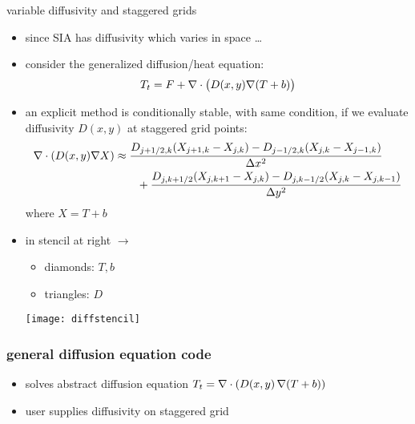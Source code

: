 \begin{frame}{variable diffusivity and staggered grids}

\begin{itemize}
  \item since SIA has diffusivity which varies in space \dots
  \item consider the generalized diffusion/heat equation:
     $$T_t = F + \nabla\cdot \big(D(x,y) \nabla (T+b)\big)$$
  \item an explicit method is conditionally stable, with same condition, if we evaluate diffusivity $D(x,y)$ at \alert{staggered} grid points:
  \small
\begin{align*}
\nabla\cdot \left(D(x,y) \nabla X\right) &\approx \frac{D_{j+1/2,k}(X_{j+1,k} - X_{j,k}) - D_{j-1/2,k}(X_{j,k} - X_{j-1,k})}{\Delta x^2} \\
	&\qquad + \frac{D_{j,k+1/2}(X_{j,k+1} - X_{j,k}) - D_{j,k-1/2}(X_{j,k} - X_{j,k-1})}{\Delta y^2}
\end{align*}
\normalsize
where $X=T+b$
\item in stencil at right $\longrightarrow$
    \begin{itemize}
    \item[] diamonds: $T,b$
    \item[] triangles: $D$
    \end{itemize}

\vspace{-15mm}
\hfill \texttt{[image: diffstencil]}
\end{itemize}
\end{frame}


\begin{frame}
  \frametitle{general diffusion equation code}


\small
\begin{itemize}
\item solves abstract diffusion equation $T_t = \nabla\cdot \left(D(x,y)\, \nabla (T+b)\right)$
\item user supplies diffusivity on staggered grid
\end{itemize}
\end{frame}


